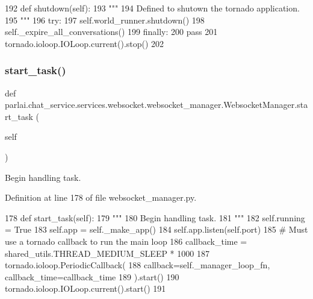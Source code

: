 \begin{DoxyCode}
192     \textcolor{keyword}{def }shutdown(self):
193         \textcolor{stringliteral}{"""}
194 \textcolor{stringliteral}{        Defined to shutown the tornado application.}
195 \textcolor{stringliteral}{        """}
196         \textcolor{keywordflow}{try}:
197             self.world\_runner.shutdown()
198             self.\_expire\_all\_conversations()
199         \textcolor{keywordflow}{finally}:
200             \textcolor{keywordflow}{pass}
201         tornado.ioloop.IOLoop.current().stop()
202 
\end{DoxyCode}
\mbox{\label{classparlai_1_1chat__service_1_1services_1_1websocket_1_1websocket__manager_1_1WebsocketManager_a79bfe4b1d87644284affbe3963c8decd}} 
\subsubsection{\texorpdfstring{start\+\_\+task()}{start\_task()}}
{\footnotesize\ttfamily def parlai.\+chat\+\_\+service.\+services.\+websocket.\+websocket\+\_\+manager.\+Websocket\+Manager.\+start\+\_\+task (\begin{DoxyParamCaption}\item[{}]{self }\end{DoxyParamCaption})}

\begin{DoxyVerb}Begin handling task.
\end{DoxyVerb}
 

Definition at line 178 of file websocket\+\_\+manager.\+py.


\begin{DoxyCode}
178     \textcolor{keyword}{def }start\_task(self):
179         \textcolor{stringliteral}{"""}
180 \textcolor{stringliteral}{        Begin handling task.}
181 \textcolor{stringliteral}{        """}
182         self.running = \textcolor{keyword}{True}
183         self.app = self.\_make\_app()
184         self.app.listen(self.port)
185         \textcolor{comment}{# Must use a tornado callback to run the main loop}
186         callback\_time = shared\_utils.THREAD\_MEDIUM\_SLEEP * 1000
187         tornado.ioloop.PeriodicCallback(
188             callback=self.\_manager\_loop\_fn, callback\_time=callback\_time
189         ).start()
190         tornado.ioloop.IOLoop.current().start()
191 
\end{DoxyCode}



